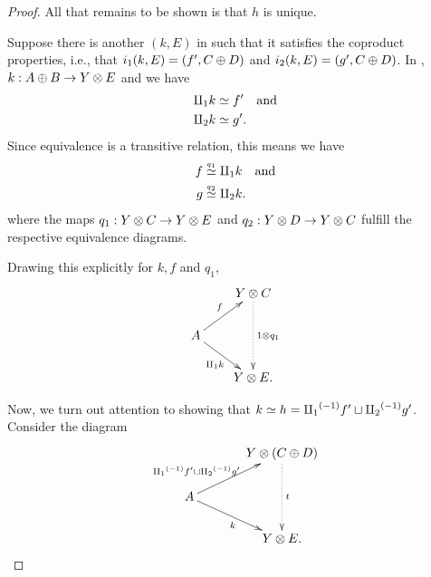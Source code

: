 \begin{proof}
  All that remains to be shown is that $h$ is unique.

  Suppose there is another $(k,E)$ in \Xt such that it satisfies the coproduct properties, i.e.,
  that $i_1 (k,E) = (f',C\oplus D)$ and $i_2 (k,E) = (g',C\oplus D)$. In \X, $k:A\oplus B \to Y \otimes E$ and we have
  \begin{align*}
    \amalg_{1} k &\overset{\scriptscriptstyle }{\simeq} f'\quad\text{and}\\
    \amalg_{2} k &\overset{\scriptscriptstyle }{\simeq} g'.
  \end{align*}
  Since equivalence is a transitive relation, this means we have
  \begin{align*}
    f &\overset{\scriptscriptstyle q_1}{\simeq} \amalg_{1} k\quad\text{and}\\
    g &\overset{\scriptscriptstyle q_2}{\simeq} \amalg_{2} k.
  \end{align*}
  where the maps $q_1: Y\otimes C \to Y\otimes E$ and $q_2:Y\otimes D \to Y\otimes C$ fulfill the respective equivalence diagrams.

  Drawing this explicitly for $k, f$ and $q_1$,
  \[
    \xymatrix @C=20pt @R=20pt{
      & Y \* C \ar@{.>}[dd]^{1\*q_1}\\
      A \ar[ur]^{f} \ar[dr]_{\cpa k} \\
      & Y\*E.
    }
  \]





  Now, we turn out attention to showing that $k \overset{\scriptscriptstyle }{\simeq} h = {\amalg_{1}}^{(-1)} f' \sqcup {\amalg_{2}}^{(-1)} g'$. Consider the
  diagram
  \begin{equation}
    \xymatrix @C=35pt @R=20pt{
      & Y \* (C\+D)\ar@{.>}[dd]^{t}\\
      A \ar[ur]^(.4){\icpa f' \djoin \icpb g'\ \ \,} \ar[dr]_{k} \\
      & Y\*E.
    }\label{diag:k-equiv-f-djoin-g}
  \end{equation}


\end{proof}
